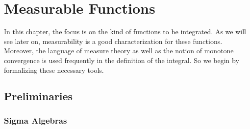  
\chapter{Measurable Functions}
\label{cha:real-valued-random}

In this chapter, the focus is on the kind of functions to be 
integrated. As we will see later on, measurability is a
good characterization for these functions. Moreover, the language of
measure theory as well as the notion of monotone convergence is used
frequently in the definition of the integral. So we begin by formalizing
these necessary tools.

\section{Preliminaries}
\label{sec:preliminaries}


\subsection{Sigma Algebras}

\label{sec:sigma}



